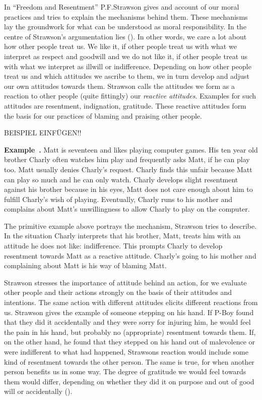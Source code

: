 \documentclass{article}
\newcounter{example}[section]
\newenvironment{example}[1][]{\refstepcounter{example}\par\medskip
   \noindent \textbf{Example~\theexample. #1} \rmfamily}{\medskip}
\begin{document}
In ``Freedom and Resentment'' P.F.Strawson gives and account of our moral
practices and tries to explain the mechanisms behind them. These mechanisms lay
the groundwork for what can be understood as moral responsibility.
In the centre of Strawson's argumentation lies (\cite[p.5]{Strawson1962}). In other words, we care a lot about how other
people treat us. We like it, if other people treat us with what we interpret as
respect and goodwill and we do not like it, if other people treat us with what
we interpret as illwill or indifference. Depending on how other people treat us
and which attitudes we ascribe to them, we in turn develop and adjust our own
attitudes towards them. Strawson calls the attitudes we form as a reaction to
other people (quite fittingly) our \textit{reactive
attitudes}. Examples for such attitudes are resentment, indignation, gratitude.
These reactive attitudes form the basis for our practices of blaming and
praising other people.

BEISPIEL EINFÜGEN!!


\begin{example}
	Matt is seventeen and likes playing computer games. His ten year old brother
	Charly often watches him play and frequently asks Matt, if he can play
	too. Matt usually denies Charly's request. Charly finds this unfair
	because Matt can play so much and he can only watch. Charly develops
	slight resentment against his brother because in his eyes, Matt
	does not care enough about him to fulfill Charly's wish of playing.
	Eventually, Charly runs to his mother and complains about Matt's
	unwillingness to allow Charly to play on the computer.
\end{example}

The primitive example above portrays the mechanism, Strawson tries to describe.
In the situation Charly interprets that his brother, Matt, treats him with an
attitude he does not like: indifference. This prompts Charly to develop
resentment towards Matt as a reactive attitude. Charly's going to his mother and
complaining about Matt is his way of blaming Matt.

Strawson stresses the importance of attitude behind an action, for we evaluate
other people and their actions strongly on the basis of their attitudes and
intentions. The same action with different attitudes elicits different reactions
from us. Strawson gives the example of someone stepping on his hand. If P-Boy
found that they did it accidentally and they were sorry for injuring him, he
would feel the pain in his hand, but probably no (appropriate) resentment
towards them. If, on the other hand, he found that they stepped on his hand out
of malevolence or were indifferent to what had happened, Strawsons reaction
would include some kind of resentment towards the other person. The same is
true, for when another person benefits us in some way. The degree of gratitude
we would feel towards them would differ, depending on whether they did it on
purpose and out of good will or accidentally (\cite[p.6]{Strawson1962}).
\end{document}
